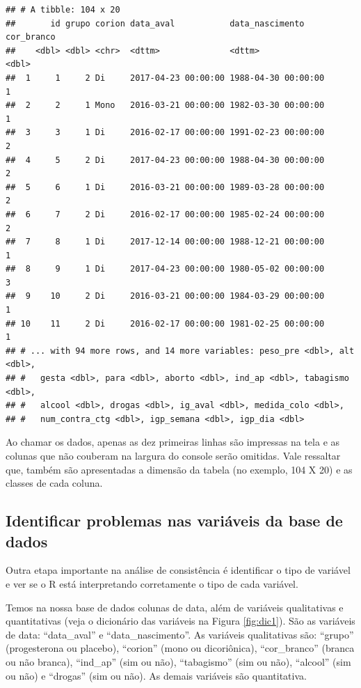 \documentclass[
]{book}
\begin{document}
\begin{verbatim}
## # A tibble: 104 x 20
##       id grupo corion data_aval           data_nascimento     cor_branco
##    <dbl> <dbl> <chr>  <dttm>              <dttm>                   <dbl>
##  1     1     2 Di     2017-04-23 00:00:00 1988-04-30 00:00:00          1
##  2     2     1 Mono   2016-03-21 00:00:00 1982-03-30 00:00:00          1
##  3     3     1 Di     2016-02-17 00:00:00 1991-02-23 00:00:00          2
##  4     5     2 Di     2017-04-23 00:00:00 1988-04-30 00:00:00          2
##  5     6     1 Di     2016-03-21 00:00:00 1989-03-28 00:00:00          2
##  6     7     2 Di     2016-02-17 00:00:00 1985-02-24 00:00:00          2
##  7     8     1 Di     2017-12-14 00:00:00 1988-12-21 00:00:00          1
##  8     9     1 Di     2017-04-23 00:00:00 1980-05-02 00:00:00          3
##  9    10     2 Di     2016-03-21 00:00:00 1984-03-29 00:00:00          1
## 10    11     2 Di     2016-02-17 00:00:00 1981-02-25 00:00:00          1
## # ... with 94 more rows, and 14 more variables: peso_pre <dbl>, alt <dbl>,
## #   gesta <dbl>, para <dbl>, aborto <dbl>, ind_ap <dbl>, tabagismo <dbl>,
## #   alcool <dbl>, drogas <dbl>, ig_aval <dbl>, medida_colo <dbl>,
## #   num_contra_ctg <dbl>, igp_semana <dbl>, igp_dia <dbl>
\end{verbatim}

Ao chamar os dados, apenas as dez primeiras linhas são impressas na tela e as colunas que não couberam na largura do console serão omitidas. Vale ressaltar que, também são apresentadas a dimensão da tabela (no exemplo, 104 X 20) e as classes de cada coluna.

\hypertarget{identificar-problemas-nas-variuxe1veis-da-base-de-dados}{%
\subsection{Identificar problemas nas variáveis da base de dados}\label{identificar-problemas-nas-variuxe1veis-da-base-de-dados}}

Outra etapa importante na análise de consistência é identificar o tipo de variável e ver se o R está interpretando corretamente o tipo de cada variável.

Temos na nossa base de dados colunas de data, além de variáveis qualitativas e quantitativas (veja o dicionário das variáveis na Figura \ref{fig:dic1}). São as variáveis de data: ``data\_aval'' e ``data\_nascimento''. As variáveis qualitativas são: ``grupo'' (progesterona ou placebo), ``corion'' (mono ou dicoriônica), ``cor\_branco'' (branca ou não branca), ``ind\_ap'' (sim ou não), ``tabagismo'' (sim ou não), ``alcool'' (sim ou não) e ``drogas'' (sim ou não). As demais variáveis são quantitativa.
\end{document}
